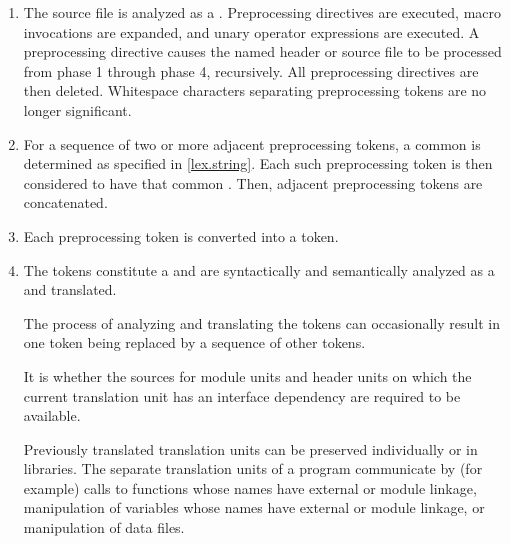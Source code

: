 \begin{enumerate}
\item The source file is analyzed as a .
Preprocessing directives are executed, macro invocations are
expanded, and  unary operator expressions are executed.
A  preprocessing directive causes the named header or
source file to be processed from phase 1 through phase 4, recursively.
All preprocessing directives are then deleted.
Whitespace characters separating preprocessing tokens are no longer significant.

\item
For a sequence of two or more adjacent  preprocessing tokens,
a common  is determined
as specified in \ref{lex.string}.
Each such  preprocessing token is then considered to have
that common .
%
Then, adjacent  preprocessing tokens are concatenated.

\item
Each preprocessing token is converted into a token.

\item
The tokens constitute a  and
are syntactically and
semantically analyzed as a  and
translated.
\begin{note}
The process of analyzing and translating the tokens can occasionally
result in one token being replaced by a sequence of other
tokens.
\end{note}
It is
whether the sources for
module units and header units
on which the current translation unit has an interface
dependency
are required to be available.
\begin{note}
Previously translated translation units can be preserved individually or in libraries.
The separate translation units of a program communicate by (for example)
calls to functions whose names have external or module linkage,
manipulation of variables whose names have external or module linkage, or
manipulation of data files.
\end{note}


\end{enumerate}
